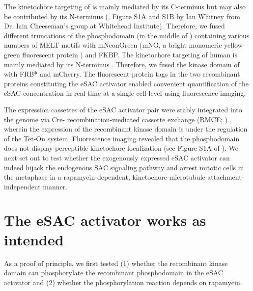The kinetochore targeting of  is mainly mediated by its C-terminus \cite{KNL1CTer_Kiyomitsu2007, Screpanti2011, Knl1CTer, MIS12CStructure_Petrovic2016, Spc105pCTer-MIND_Maskell2010} but may also be contributed by its N-terminus (\cite{eSAC}, Figure S1A and S1B by Ian Whitney from Dr. Iain Cheeseman's group at Whitehead Institute). Therefore, we fused different truncations of the  phosphodomain (in the middle of ) containing various numbers of MELT motifs with mNeonGreen (mNG, a bright monomeric yellow-green fluorescent protein \cite{mNG}) and FKBP. The kinetochore targeting of human  is mainly mediated by its N-terminus \cite{MPS1Localization_Ji, MPS1Localization_Hiruma, BuddingYeasteSAC}. Therefore, we fused the kinase domain of  with FRB* \cite{FRB_T2098L} and mCherry. The fluorescent protein tags in the two recombinant proteins constituting the eSAC activator enabled convenient quantification of the eSAC concentration in real time at a single-cell level using fluorescence imaging.

The expression cassettes of the eSAC activator pair were stably integrated into the genome via Cre- recombination-mediated cassette exchange (RMCE; ) \cite{HeLa-A12_Khandelia2011, HeLa-A12_Ballister2014}, wherein the expression of the recombinant  kinase domain is under the regulation of the Tet-On system. Fluorescence imaging revealed that the  phosphodomain does not display perceptible kinetochore localization (see Figure S1A of \cite{eSAC}). We next set out to test whether the exogenously expressed eSAC activator can indeed hijack the endogenous SAC signaling pathway and arrest mitotic cells in the metaphase in a rapamycin-dependent, kinetochore-microtubule attachment-independent manner.

\section{The eSAC activator works as intended}

As a proof of principle, we first tested (1) whether the recombinant  kinase domain can phosphorylate the recombinant  phosphodomain in the eSAC activator and (2) whether the phosphorylation reaction depends on rapamycin.

